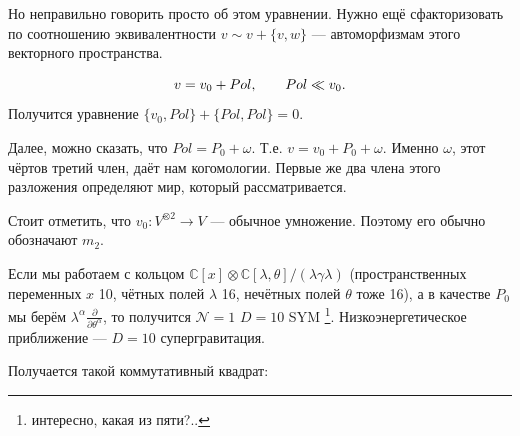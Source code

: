\documentclass[11pt]{article}
\theoremstyle{remark}
\theoremstyle{definition}
\newcommand{\que}[1]{\footnote{\textcolor[rgb]{0.38,0.69,0.82}{#1}}}
\begin{document}
Но неправильно говорить просто об этом уравнении. Нужно ещё сфакторизовать по соотношению эквивалентности $v\sim v + \{v,w\}$ --- автоморфизмам этого векторного пространства.

$$v = v_0 + Pol, \hskip 20 pt Pol \ll v_0.$$ Получится уравнение $\{ v_0, Pol \} + \{ Pol, Pol \} = 0.$

Далее, можно сказать, что $Pol = P_0 + \omega$. Т.е. $v = v_0 + P_0 + \omega$. Именно $\omega$, этот чёртов третий член, даёт нам когомологии. Первые же два члена этого разложения определяют мир, который рассматривается.

Стоит отметить, что $v_0: V^{\otimes 2} \to V$ --- обычное умножение. Поэтому его обычно обозначают $m_2$.

Если мы работаем с кольцом $\mathbb{C}[x] \otimes \mathbb{C}[\lambda, \theta] / (\lambda \gamma \lambda)$ (пространственных переменных $x$ 10, чётных полей $\lambda$ 16, нечётных полей $\theta$ тоже 16), а в качестве $P_0$ мы берём $\lambda^{\alpha} \frac{\partial}{\partial \theta^{\alpha}}$, то получится $\mathcal{N} = 1$ $D=10$ SYM \que{интересно, какая из пяти?..}. Низкоэнергетическое приближение --- $D=10$ супергравитация.

Получается такой коммутативный квадрат:


\begin{center}

\end{center}
\end{document}
